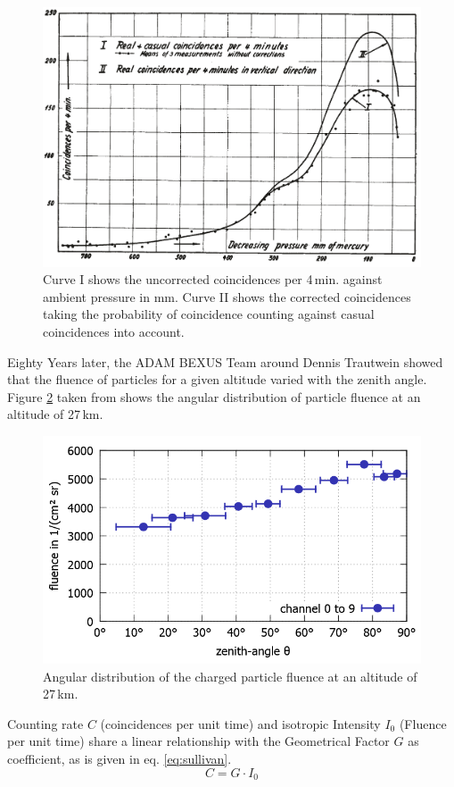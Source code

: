 \begin{figure}[H]
    \centering
    \includegraphics[width=0.8\linewidth]{images/01_background/original_regener_pfotzer.png}
    \caption[Regener-Pfotzer-Maximum as shown in \cite{regener-pfotzer-1935}]{Curve I shows the uncorrected coincidences per 4\,min. against ambient pressure in mm. Curve II shows the corrected coincidences taking the probability of coincidence counting against casual coincidences into account.}
    \label{fig:regener1935}
\end{figure}

Eighty Years later, the \ac{ADAM} \ac{BEXUS} Team around Dennis Trautwein showed that the fluence of particles for a given altitude varied with the zenith angle. Figure \ref{fig:martensen2015} taken from \cite{martensen2015} shows the angular distribution of particle fluence at an altitude of 27\,km.

\begin{figure}[H]
    \centering
    \includegraphics[width=0.6\linewidth]{images/01_background/martensen.png}
    \caption[Results of \acs{ADAM} at 27\,km]{Angular distribution of the charged particle fluence at an altitude of 27\,km.}
    \label{fig:martensen2015}
\end{figure}

Counting rate $C$ (coincidences per unit time) and isotropic Intensity $I_0$ (Fluence per unit time) share a linear relationship with the Geometrical Factor $G$ as coefficient, as is given in eq. \eqref{eq:sullivan}\cite{SULLIVAN19715}.
\begin{equation}
    C=G\cdot I_0
    \label{eq:sullivan}
\end{equation}


